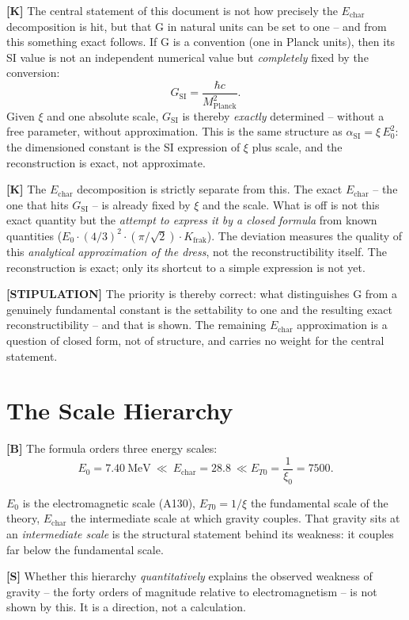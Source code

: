 \textbf{[K]} The central statement of this document is not how precisely the
$E_\text{char}$ decomposition is hit, but that G in natural units can be set to one -- and from this
something exact follows.
If G is a convention (one in Planck units), then its SI
value is not an independent numerical value but \emph{completely} fixed by the
conversion:
\[
  G_\text{SI} = \frac{\hbar c}{M_\text{Planck}^2} .
\]
Given $\xi$ and one absolute scale, $G_\text{SI}$ is thereby \emph{exactly}
determined -- without a free parameter, without approximation. This is the same
structure as $\alpha_\text{SI} = \xi\,E_0^2$: the dimensioned constant is the
SI expression of $\xi$ plus scale, and the reconstruction is exact, not approximate.

\textbf{[K]} The $E_\text{char}$ decomposition is strictly separate from this.
The exact $E_\text{char}$ -- the one that hits $G_\text{SI}$ -- is already fixed
by $\xi$ and the scale. What is off is not this exact quantity but
the \emph{attempt to express it by a closed formula} from known quantities
($E_0\cdot(4/3)^2\cdot(\pi/\sqrt2)\cdot K_\text{frak}$). The deviation measures
the quality of this \emph{analytical approximation of the dress}, not the
reconstructibility itself. The reconstruction is exact; only its shortcut to
a simple expression is not yet.

\textbf{[STIPULATION]} The priority is thereby correct: what distinguishes G from
a genuinely fundamental constant is the settability to one and the resulting exact
reconstructibility -- and that is shown. The remaining $E_\text{char}$ approximation
is a question of closed form, not of structure, and carries no weight for the
central statement.

\section{The Scale Hierarchy}

\textbf{[B]} The formula orders three energy scales:
\[
  E_0 = 7{.}40\ \text{MeV}\ \ll\ E_\text{char} = 28{.}8\ \ll  E_{T0} = \frac{1}{\xi_0} = 7500 .
\]

$E_0$ is the electromagnetic scale (A130), $E_{T0}=1/\xi$ the fundamental scale
of the theory, $E_\text{char}$ the intermediate scale at which gravity couples.
That gravity sits at an \emph{intermediate scale} is the structural statement
behind its weakness: it couples far below the fundamental scale.

\textbf{[S]} Whether this hierarchy \emph{quantitatively} explains the observed
weakness of gravity -- the forty orders of magnitude relative to electromagnetism
-- is not shown by this. It is a direction, not a calculation.

